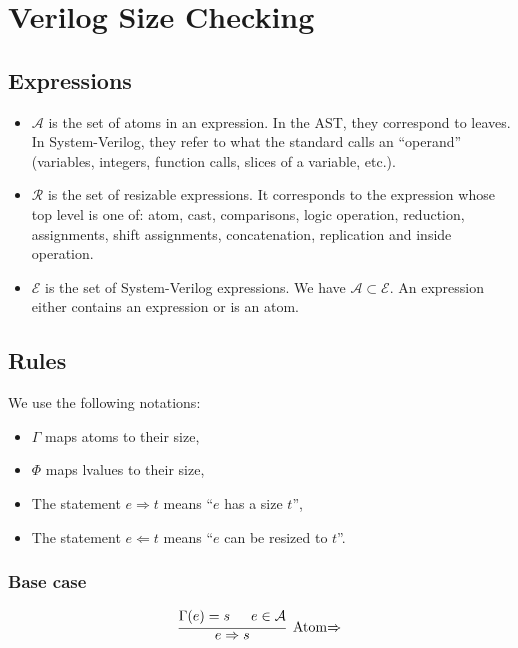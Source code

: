 \documentclass{article}
\renewcommand{\S}{\ensuremath{\Rightarrow}}
\newcommand{\C}{\ensuremath{\Leftarrow}}
\newcommand{\s}[2]{#1 \S{} #2}
\renewcommand{\c}[2]{#1 \C{} #2}
\begin{document}
\section*{Verilog Size Checking}

\subsection*{Expressions}

\begin{itemize}
    \item $\mathcal{A}$ is the set of atoms in an expression. In the AST, they correspond to leaves. In System-Verilog, they refer to what the standard calls an ``operand'' (variables, integers, function calls, slices of a variable, etc.).
    \item $\mathcal{R}$ is the set of resizable expressions. It corresponds to the expression whose top level is one of: atom, cast, comparisons, logic operation, reduction, assignments, shift assignments, concatenation, replication and inside operation.
    \item $\mathcal{E}$ is the set of System-Verilog expressions. We have $\mathcal{A} \subset \mathcal{E}$. An expression either contains an expression or is an atom.
\end{itemize}

\subsection*{Rules}
We use the following notations:
\begin{itemize}
    \item $\Gamma$ maps atoms to their size,
    \item $\Phi$ maps lvalues to their size,
    \item The statement $\s{e}{t}$ means ``$e$ has a size $t$'',
    \item The statement $\c{e}{t}$ means ``$e$ can be resized to $t$''.
\end{itemize}



\subsubsection*{Base case}

\begin{equation*}
    \begin{prooftree}
        \hypo{\Gamma(e) = s}
        \hypo{e \in \mathcal{A}}
        \infer2[Atom\S]{\s{e}{s}}
    \end{prooftree}
\end{equation*}
\end{document}
